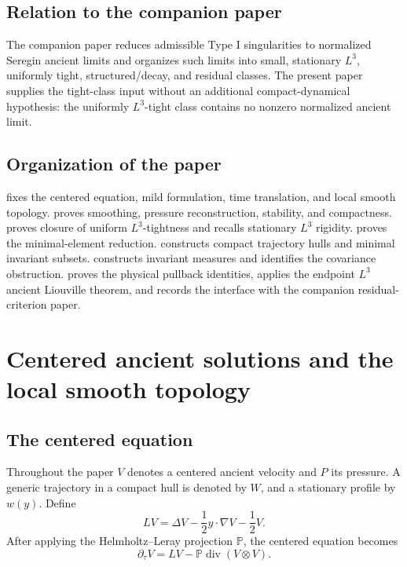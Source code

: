 \documentclass[11pt]{amsart}
\theoremstyle{plain}
\theoremstyle{definition}
\theoremstyle{remark}
\numberwithin{equation}{section}
\newcommand{\divergence}{\operatorname{div}}
\begin{document}
\subsection{Relation to the companion paper}

The companion paper \cite{DuranPaperI} reduces admissible Type I singularities
to normalized Seregin ancient limits and organizes such limits into small,
stationary \(L^3\), uniformly tight, structured/decay, and residual classes.
The present paper supplies the tight-class input without an additional
compact-dynamical hypothesis: the uniformly \(L^3\)-tight class contains no
nonzero normalized ancient limit.

\subsection{Organization of the paper}

 fixes the centered equation, mild formulation,
time translation, and local smooth topology.  
proves smoothing, pressure reconstruction, stability, and compactness.
 proves closure of uniform \(L^3\)-tightness and
recalls stationary \(L^3\) rigidity.   proves the
minimal-element reduction.   constructs compact
trajectory hulls and minimal invariant subsets.  
constructs invariant measures and identifies the covariance obstruction.
 proves the physical pullback identities,
applies the endpoint \(L^3\) ancient Liouville theorem, and records the
interface with the companion residual-criterion paper.

\section{Centered ancient solutions and the local smooth topology}
\label{sec:centered-topology}

\subsection{The centered equation}

Throughout the paper \(V\) denotes a centered ancient velocity and \(P\) its
pressure.  A generic trajectory in a compact hull is denoted by \(W\), and a
stationary profile by \(w(y)\).  Define
\[
   L V=\Delta V-\frac12 y\cdot\nabla V-\frac12 V .
\]
After applying the Helmholtz--Leray projection \(\mathbb P\), the centered
equation becomes
\begin{equation}\label{eq:projected}
   \partial_\tau V
   =
   LV-\mathbb P\divergence(V\otimes V).
\end{equation}
\end{document}
